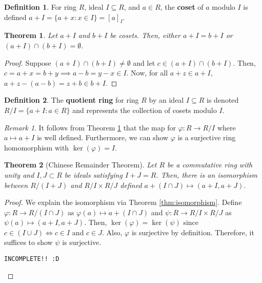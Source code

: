 \documentclass[parskip=half]{scrartcl}  %
\theoremstyle{definition}
\newtheorem{definition}{Definition}[section]
\theoremstyle{plain}
\newtheorem{theorem}{Theorem}[definition]
\theoremstyle{remark}
\newtheorem{remark}{Remark}[definition]
\begin{document}
\begin{definition}
    For ring $R$, ideal $I\subseteq R$, and $a\in R$, the \textbf{coset} of $a$ modulo $I$ is
    defined $a+I=\{a+x:x\in I\}=[a]_I$.
\end{definition}

\begin{theorem}
    \label{thm:cosets disjoint}
    Let $a+I$ and $b+I$ be cosets.
    Then, either $a+I=b+I$ or $(a+I)\cap(b+I)=\emptyset$.
\end{theorem}

\begin{proof}
    Suppose $(a+I)\cap(b+I)\neq\emptyset$ and let $c\in(a+I)\cap(b+I)$.
    Then, $c=a+x=b+y\implies a-b=y-x\in I$.
    Now, for all $a+z\in a+I$, $a+z-(a-b)=z+b\in b+I$.
\end{proof}

\begin{definition}
    The \textbf{quotient ring} for ring $R$ by an ideal $I\subseteq R$ is denoted
    $R/I=\{a+I:a\in R\}$ and represents the collection of cosets modulo $I$.
\end{definition}

\begin{remark}
    It follows from Theorem \ref{thm:cosets disjoint} that the map for $\varphi:R\to R/I$ where
    $a\mapsto a+I$ is well defined.
    Furthermore, we can show $\varphi$ is a surjective ring homomorphism with $\ker(\varphi)=I$.
\end{remark}

\begin{theorem}[Chinese Remainder Theorem]
    Let $R$ be a commutative ring with unity and $I,J\subset R$ be ideals satisfying $I+J=R$.
    Then, there is an isomorphism between $R/(I+J)$ and $R/I\times R/J$ defined
    $a+(I\cap J)\mapsto (a+I,a+J)$.
\end{theorem}

\begin{proof}
    We explain the isomorphism via Theorem \ref{thm:isomorphism}.
    Define $\varphi:R\to R/(I\cap J)$ as $\varphi(a)\mapsto a+(I\cap J)$ and
    $\psi:R\to R/I\times R/J$ as $\psi(a)\mapsto(a+I,a+J)$.
    Then, $\ker(\varphi)=\ker(\psi)$ since $c\in(I\cup J)\iff c\in I$ and $c\in J$.
    Also, $\varphi$ is surjective by definition.
    Therefore, it suffices to show $\psi$ is surjective.
    \begin{center}\texttt{INCOMPLETE!! :D}\end{center}
\end{proof}
\end{document}
